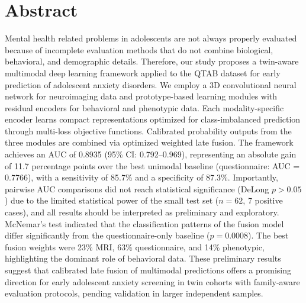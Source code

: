 \documentclass[10pt,letterpaper]{article}
\begin{document}
\section*{Abstract}
Mental health related problems in adolescents are not always properly evaluated because of incomplete evaluation methods that do not combine biological, behavioral, and demographic details. Therefore, our study proposes a twin-aware multimodal deep learning framework applied to the QTAB dataset for early prediction of adolescent anxiety disorders. We employ a 3D convolutional neural network for neuroimaging data and prototype-based learning modules with residual encoders for behavioral and phenotypic data. Each modality-specific encoder learns compact representations optimized for class-imbalanced prediction through multi-loss objective functions. Calibrated probability outputs from the three modules are combined via optimized weighted late fusion. The framework achieves an AUC of 0.8935 (95\% CI: 0.792--0.969), representing an absolute gain of 11.7 percentage points over the best unimodal baseline (questionnaire: AUC = 0.7766), with a sensitivity of 85.7\% and a specificity of 87.3\%. Importantly, pairwise AUC comparisons did not reach statistical significance (DeLong $p > 0.05$) due to the limited statistical power of the small test set ($n = 62$, 7 positive cases), and all results should be interpreted as preliminary and exploratory. McNemar's test indicated that the classification patterns of the fusion model differ significantly from the questionnaire-only baseline ($p = 0.0008$). The best fusion weights were 23\% MRI, 63\% questionnaire, and 14\% phenotypic, highlighting the dominant role of behavioral data. These preliminary results suggest that calibrated late fusion of multimodal predictions offers a promising direction for early adolescent anxiety screening in twin cohorts with family-aware evaluation protocols, pending validation in larger independent samples.



%

\linenumbers
\end{document}
